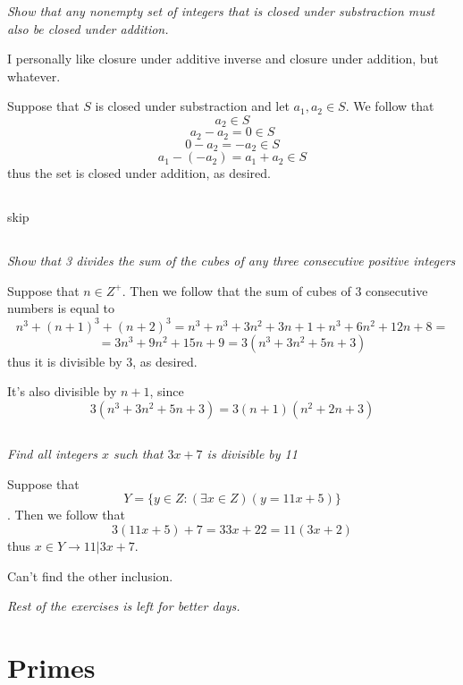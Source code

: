 \documentclass[11pt,oneside,titlepage]{book}
\begin{document}
\textit{Show that any nonempty set of integers that is closed under substraction must also
  be closed under addition.}

I personally like closure under additive inverse and closure under addition, but whatever.

Suppose that $S$ is closed under substraction and let $a_1, a_2 \in S$. We follow that
$$a_2 \in S$$
$$a_2 - a_2 = 0 \in S$$
$$0 - a_2 = -a_2 \in S$$
$$a_1 -(- a_2) = a_1 + a_2 \in S$$
thus the set is closed under addition, as desired.

\subsection{}

\subsection{}

skip

\subsection{}

\textit{Show that 3 divides the sum of the cubes of any three consecutive positive integers}

Suppose that $n \in Z^+$. Then we follow that the sum of cubes of 3 consecutive
numbers is equal to
$$n^3 + (n + 1)^3 + (n + 2)^3 = n^3 + n^3 + 3n^2 + 3n + 1 + n^3 + 6n^2 + 12n + 8 =$$
$$ = 3n^3 + 9n^2 + 15n + 9 = 3(n^3 + 3n^2 + 5n + 3)$$
thus it is divisible by 3, as desired.

It's also divisible by $n + 1$, since
$$3(n^3 + 3n^2 + 5n + 3) = 3(n + 1)(n^2 + 2n + 3)$$

\subsection{}

\textit{Find all integers $x$ such that $3x + 7$ is divisible by 11}

Suppose that
$$Y = \{y \in Z: (\exists x \in Z)(y = 11x + 5)\}$$.
Then we follow that
$$3(11 x + 5) + 7 = 33x + 22 = 11(3x + 2)$$
thus $x \in Y \to 11|3x + 7$.

Can't find the other inclusion.

\textit{Rest of the exercises is left for better days.}

\section{Primes}
\end{document}
